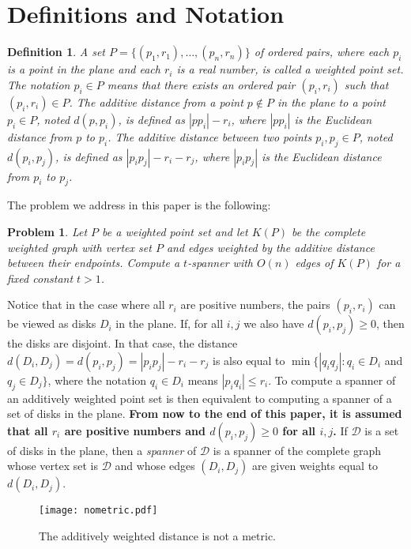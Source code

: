 \documentclass[pdftex,leqno,fleqn,12pt]{article}
\newtheorem{definition}[theorem]{Definition}
\newtheorem{problem}[theorem]{Problem}
\begin{document}
\section{Definitions and Notation}\label{section-disk-del-def}

\begin{definition}
A set $P=\{(p_1,r_1),\ldots,(p_n,r_n)\}$ of ordered pairs, where each $p_i$ is a point in the plane
and each $r_i$ is a real number, is called a \emph{weighted point set}. The notation $p_i\in P$
means that there exists an ordered pair $(p_i,r_i)$ such that $(p_i,r_i)\in P$. The \emph{additive
distance} from a point $p\not\in P$ in the plane to a point $p_i\in P$, noted $d(p,p_i)$, is
defined as $|pp_i|-r_i$, where $|pp_i|$ is the Euclidean distance from $p$ to $p_i$. The \emph{additive distance}
between two points $p_i,p_j\in P$, noted $d(p_i,p_j)$, is defined as $|p_ip_j|-r_i-r_j$, where $|p_ip_j|$
is the Euclidean distance from $p_i$ to $p_j$.
\end{definition}
The problem we address in this paper is the following:
\begin{problem} Let $P$ be a weighted point set and let $K(P)$ be
the complete weighted graph with vertex set $P$ and edges weighted
by the additive distance between their endpoints. Compute a
$t$-spanner with $O(n)$ edges of $K(P)$ for a fixed constant $t>1$.
\end{problem}

Notice that in the case where all $r_i$ are positive numbers, the pairs
$(p_i,r_i)$ can be viewed as disks $D_i$ in the plane. If, for all $i,j$ we
also have $d(p_i,p_j)\geq 0$, then the disks are disjoint. In that case, the
distance $d(D_i,D_j)=d(p_i,p_j)=|p_ip_j|-r_i-r_j$ is also equal to
$\min\{|q_iq_j|:q_i\in D_i$ and $q_j\in D_j\}$, where the notation $q_i\in D_i$
means $|p_iq_i|\leq r_i$.  To compute a spanner of an additively weighted point
set is then equivalent to computing a spanner of a set of disks in the plane.
\textbf{From now to the end of this paper, it is assumed that all $r_i$ are
positive numbers and $d(p_i,p_j)\geq 0$ for all $i,j$.} If $\mathcal{D}$ is a
set of disks in the plane, then a \emph{spanner} of $\mathcal{D}$ is a spanner
of the complete graph whose vertex set is $\mathcal{D}$ and whose edges
$(D_i,D_j)$ are given weights equal to $d(D_i,D_j)$.

\begin{figure}
\centering\texttt{[image: nometric.pdf]}\caption{The additively weighted distance is not a
metric.}\label{fig-nometric}
\end{figure}
\end{document}

